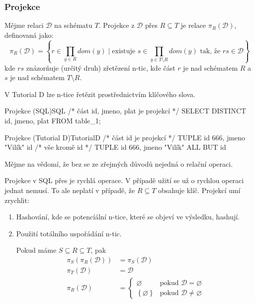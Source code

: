 \subsubsection{Projekce}
Mějme relaci $\mathcal{D}$ na schématu $T$. Projekce z $\mathcal{D}$ přes $R \subseteq T$ je relace $\pi_{R}(\mathcal{D})$, definovaná jako:
$$
\pi_{R}(\mathcal{D}) = \left\{ r \in \prod_{y \in R} dom(y) \; | \; \text{existuje } s \in \prod_{y \in T \setminus R} dom(y) \text{ tak, že } rs \in \mathcal{D} \right\}
$$
kde $rs$ znázorňuje (určitý druh) zřetězení n-tic, kde část $r$ je nad schématem $R$ a $s$ je nad schématem $ T \setminus R$.

V Tutorial D lze n-tice řetězit prostřednictvím klíčového slova.
\begin{upcode}{Projekce (SQL)}{}{SQL}
/* část id, jmeno, plat je projekcí */
SELECT DISTINCT id, jmeno, plat FROM table_1;
\end{upcode}
\begin{upcode}{Projekce (Tutorial D)}{}{TutorialD}
/* část {id} je projekcí */
TUPLE {id 666, jmeno "Vilík"} {id}
/* vše kromě id */
TUPLE {id 666, jmeno "Vilík"} {ALL BUT id}
\end{upcode}
Mějme na vědomí, že bez se ze zřejmých důvodů nejedná o relační operaci.

Projekce v SQL přes je rychlá operace. V případě užití se už o rychlou operaci jednat nemusí. To ale neplatí v případě, že $R \subseteq T$ obsahuje klíč. Projekcí umí zrychlit:
\begin{enumerate}
\item Hashování, kde se potencíální n-tice, které se objeví ve výsledku, hashují.
\item Použití totálního uspořádání n-tic.
\begin{upquote}
Pokud máme $S \subseteq R \subseteq T$, pak
\begin{align*}
\pi_{S} (\pi_{R}(\mathcal{D})) &= \pi_{S}(\mathcal{D}) \\
\pi_{T} (\mathcal{D}) &= \mathcal{D} \\
\pi_{R} (\mathcal{D}) &=\left\{\!\!\!
\begin{array}{ll}
\varnothing & \text{pokud } \mathcal{D} = \varnothing \\
\left\{ \varnothing \right\} & \text{pokud } \mathcal{D} \neq \varnothing
\end{array}\right.
\end{align*}
\end{upquote}
\end{enumerate}

